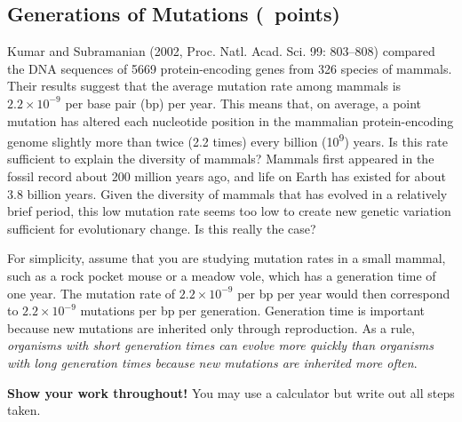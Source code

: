\documentclass[11pt, addpoints, hidelinks]{exam}
\begin{document}
\subsection*{Generations of Mutations (\numpoints\ points)}

Kumar and Subramanian (2002, Proc. Natl. Acad. Sci. 99: 803--808) compared 
the DNA sequences of 5669 protein-encoding genes from 326 species of mammals. 
Their results suggest that the average mutation rate among mammals is $2.2 \times
10^{-9}$ per base pair (bp) per year. This means that, on average, a 
point mutation has altered each nucleotide position in the mammalian protein-encoding 
genome slightly more than twice (2.2 times) every billion (10\textsuperscript{9}) 
years. Is this rate sufficient to explain the diversity of mammals? Mammals first 
appeared in the fossil record about 200 million years ago, and life on Earth has
existed for about 3.8 billion years. Given the diversity of mammals that has evolved 
in a relatively brief period, this low mutation rate seems too low to create new genetic 
variation sufficient for evolutionary change. Is this really the case?

For simplicity, assume that you are studying mutation rates in a small mammal, such 
as a rock pocket mouse or a meadow vole, which has a generation time of one year. 
The mutation rate of $2.2 \times 10^{-9}$ per bp per year would then 
correspond to $2.2 \times 10^{-9}$ mutations per bp per generation. 
Generation time is important because new mutations are inherited only through 
reproduction. As a rule, \emph{organisms with short generation times can evolve more 
quickly than organisms with long generation times because new mutations are inherited 
more often}.

\vspace{\baselineskip}

\noindent \textbf{Show your work throughout!} You may use a calculator but write out all steps taken.
\end{document}
